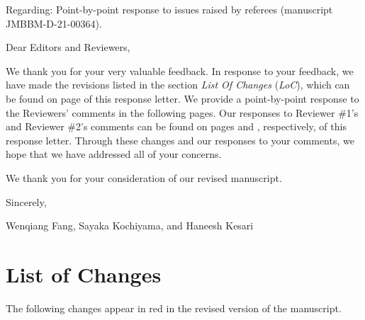 \documentclass[11pt,letterpaper]{report}
\begin{document}
\newpage
\setcounter{page}{1}
\thispagestyle{fancy}
\phantom{x}
\vspace{4em}

Regarding: Point-by-point response to issues raised by referees  (manuscript JMBBM-D-21-00364).

\vspace{3em}
Dear Editors and Reviewers,
\vspace{1em}

We thank you for your very valuable feedback. In response to your feedback, we have made the revisions listed in the section \textit{List Of Changes} (\textit{LoC}), which can be found on  page \pageref{LoCpage} of this response letter. We  provide a point-by-point response to the Reviewers' comments in the following pages. Our responses to Reviewer \#1's and Reviewer \#2's comments can be found on pages \pageref{rev1} and \pageref{rev2}, respectively, of this response letter. Through these changes and our responses to your comments, we hope that we have addressed all of your concerns.

We thank you for your consideration of our revised manuscript.

\vspace{2em}
Sincerely,

Wenqiang Fang, Sayaka Kochiyama, and Haneesh Kesari

\clearpage
\pagestyle{plain}
\section*{List of Changes}
\label{LoCpage}
The following changes  appear in red in the revised version of the manuscript.

\end{document}
